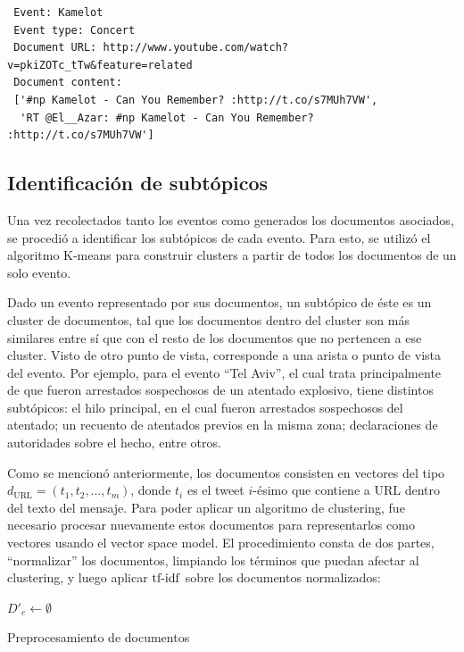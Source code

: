 \begin{verbatim}
 Event: Kamelot
 Event type: Concert
 Document URL: http://www.youtube.com/watch?v=pkiZOTc_tTw&feature=related
 Document content:
 ['#np Kamelot - Can You Remember? :http://t.co/s7MUh7VW',
  'RT @El__Azar: #np Kamelot - Can You Remember? :http://t.co/s7MUh7VW']
\end{verbatim}


\subsection{Identificación de subtópicos}
\label{sec-4.2.2}


    Una vez recolectados tanto los eventos como generados los
    documentos asociados, se procedió a identificar los subtópicos de
    cada evento. Para esto, se utilizó el algoritmo K-means para
    construir clusters a partir de todos los documentos de un solo
    evento.

    Dado un evento representado por sus documentos, un subtópico de 
    éste es un cluster de documentos, tal que los documentos dentro del cluster 
    son más similares entre sí que con el resto de los documentos que no 
    pertencen a ese cluster. Visto de otro punto de vista, corresponde a una
    arista o punto de vista del evento. Por ejemplo, para el evento ``Tel Aviv'',
    el cual trata principalmente de que fueron arrestados sospechosos de un 
    atentado explosivo, tiene distintos subtópicos: el hilo principal, en el cual
    fueron arrestados sospechosos del atentado; un recuento de atentados previos en
    la misma zona; declaraciones de autoridades sobre el hecho, entre otros.  

    Como se mencionó anteriormente, los documentos consisten en
    vectores del tipo $d_{\textrm{URL}}=(t_1,t_2,\ldots,t_m)$, donde
    $t_i$ es el tweet $i$-ésimo que contiene a URL dentro del texto
    del mensaje. Para poder aplicar un algoritmo de clustering, fue
    necesario procesar nuevamente estos documentos para representarlos
    como vectores usando el vector space model. El procedimiento
    consta de dos partes, ``normalizar'' los documentos, limpiando los
    términos que puedan afectar al clustering, y luego aplicar
    $\operatorname{tf-idf}$ sobre los documentos normalizados:

\begin{algorithm}[H]
 $D'_e \leftarrow \emptyset$\;
 \caption{Preprocesamiento de documentos}
\end{algorithm}

